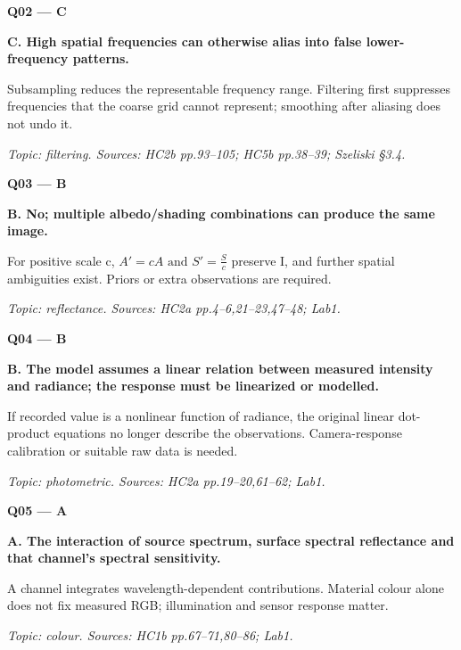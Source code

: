 \documentclass[11pt,a4paper]{article}
\begin{document}
\par\vspace{12pt}
\begin{minipage}{\linewidth}
\textbf{Q02 — C}\par\smallskip
\textbf{C. High spatial frequencies can otherwise alias into false lower-frequency patterns.}\par
Subsampling reduces the representable frequency range. Filtering first suppresses frequencies that the coarse grid cannot represent; smoothing after aliasing does not undo it.\par
{\small\itshape Topic: filtering. Sources: HC2b pp.93–105; HC5b pp.38–39; Szeliski §3.4.}

\end{minipage}
\par\vspace{12pt}
\begin{minipage}{\linewidth}
\textbf{Q03 — B}\par\smallskip
\textbf{B. No; multiple albedo/\allowbreak{}shading combinations can produce the same image.}\par
For positive scale c,\allowbreak{} \(A'=cA\text{ and }S'=\frac{S}{c}\) preserve I,\allowbreak{} and further spatial ambiguities exist. Priors or extra observations are required.\par
{\small\itshape Topic: reflectance. Sources: HC2a pp.4–6,\allowbreak{}21–23,\allowbreak{}47–48; Lab1.}

\end{minipage}
\par\vspace{12pt}
\begin{minipage}{\linewidth}
\textbf{Q04 — B}\par\smallskip
\textbf{B. The model assumes a linear relation between measured intensity and radiance; the response must be linearized or modelled.}\par
If recorded value is a nonlinear function of radiance,\allowbreak{} the original linear dot-product equations no longer describe the observations. Camera-response calibration or suitable raw data is needed.\par
{\small\itshape Topic: photometric. Sources: HC2a pp.19–20,\allowbreak{}61–62; Lab1.}

\end{minipage}
\par\vspace{12pt}
\begin{minipage}{\linewidth}
\textbf{Q05 — A}\par\smallskip
\textbf{A. The interaction of source spectrum,\allowbreak{} surface spectral reflectance and that channel's spectral sensitivity.}\par
A channel integrates wavelength-dependent contributions. Material colour alone does not fix measured RGB; illumination and sensor response matter.\par
{\small\itshape Topic: colour. Sources: HC1b pp.67–71,\allowbreak{}80–86; Lab1.}

\end{minipage}
\end{document}
